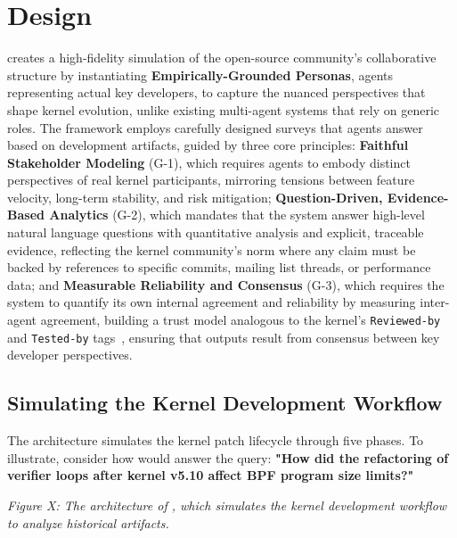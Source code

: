 
\section{Design}
\label{sec:design}

\sys creates a high-fidelity simulation of the open-source community's collaborative structure by instantiating \textbf{Empirically-Grounded Personas}, agents representing actual key developers, to capture the nuanced perspectives that shape kernel evolution, unlike existing multi-agent systems that rely on generic roles. The framework employs carefully designed surveys that agents answer based on development artifacts, guided by three core principles: \textbf{Faithful Stakeholder Modeling} (G-1), which requires agents to embody distinct perspectives of real kernel participants, mirroring tensions between feature velocity, long-term stability, and risk mitigation; \textbf{Question-Driven, Evidence-Based Analytics} (G-2), which mandates that the system answer high-level natural language questions with quantitative analysis and explicit, traceable evidence, reflecting the kernel community's norm where any claim must be backed by references to specific commits, mailing list threads, or performance data; and \textbf{Measurable Reliability and Consensus} (G-3), which requires the system to quantify its own internal agreement and reliability by measuring inter-agent agreement, building a trust model analogous to the kernel's \texttt{Reviewed-by} and \texttt{Tested-by} tags~\cite{kerneldocs-submitting}, ensuring that outputs result from consensus between key developer perspectives.


\subsection{Simulating the Kernel Development Workflow}

The \sys architecture simulates the kernel patch lifecycle through five phases. To illustrate, consider how \sys would answer the query: \textbf{"How did the refactoring of verifier loops after kernel v5.10 affect BPF program size limits?"}

\emph{Figure X: The architecture of \sys, which simulates the kernel development workflow to analyze historical artifacts.}

